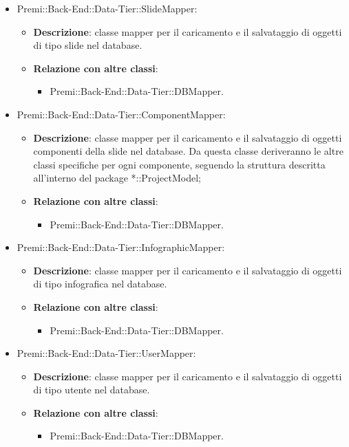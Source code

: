 \begin{itemize}
			\item Premi::Back-End::Data-Tier::SlideMapper:
			\begin{itemize}
				\item \textbf{Descrizione}: classe mapper per il caricamento e il salvataggio di oggetti di tipo \gls{slide} nel \gls{database}.
				\item \textbf{Relazione con altre classi}:
				\begin{itemize}
					\item Premi::Back-End::Data-Tier::DBMapper.
				\end{itemize}
			\end{itemize}
			
			\item Premi::Back-End::Data-Tier::ComponentMapper:
			\begin{itemize}
				\item \textbf{Descrizione}: classe mapper per il caricamento e il salvataggio di oggetti componenti della \gls{slide} nel \gls{database}. Da questa classe deriveranno le altre classi specifiche per ogni componente, seguendo la struttura descritta all'interno del package *::ProjectModel;
				\item \textbf{Relazione con altre classi}:
				\begin{itemize}
					\item Premi::Back-End::Data-Tier::DBMapper.
				\end{itemize}
			\end{itemize}
			
			\item Premi::Back-End::Data-Tier::InfographicMapper:
			\begin{itemize}
				\item \textbf{Descrizione}: classe mapper per il caricamento e il salvataggio di oggetti di tipo \gls{infografica} nel \gls{database}.
				\item \textbf{Relazione con altre classi}:
				\begin{itemize}
					\item Premi::Back-End::Data-Tier::DBMapper.
				\end{itemize}
			\end{itemize}
			
			\item Premi::Back-End::Data-Tier::UserMapper:
			\begin{itemize}
				\item \textbf{Descrizione}: classe mapper per il caricamento e il salvataggio di oggetti di tipo utente nel \gls{database}.
				\item \textbf{Relazione con altre classi}:
				\begin{itemize}
					\item Premi::Back-End::Data-Tier::DBMapper.
				\end{itemize}
			\end{itemize}
		\end{itemize}
